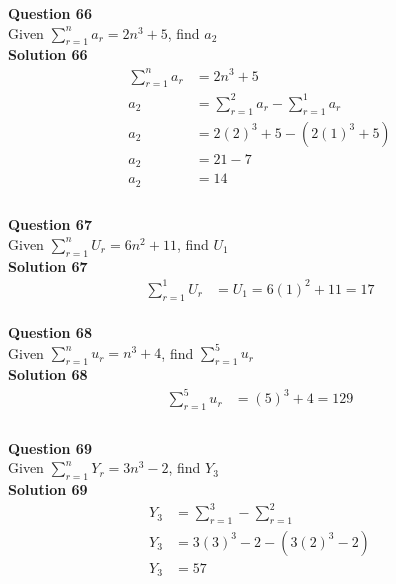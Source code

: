 \documentclass{article}
\begin{document}
\noindent\textbf{Question 66}\\[5pt]
Given $\displaystyle\sum_{r=1}^{n} a_r = 2n^3+5$, find $a_2$\\[5pt]
\noindent\textbf{Solution 66}\\[5pt]
\begin{align*}
\displaystyle\sum_{r=1}^{n} a_r &= 2n^3+5\\[2pt]
a_2&=\displaystyle\sum_{r=1}^{2} a_r - \displaystyle\sum_{r=1}^{1} a_r \\[2pt]
a_2&= 2(2)^3+5- (2(1)^3+5) \\[2pt]
a_2&= 21- 7 \\[2pt]
a_2&= 14 \\[2pt]
\end{align*}\\[10pt]

\noindent\textbf{Question 67}\\[5pt]
Given $\displaystyle\sum_{r=1}^{n} U_r = 6n^2+11$, find $U_1$\\[5pt]
\noindent\textbf{Solution 67}\\[5pt]
\begin{align*}
\displaystyle\sum_{r=1}^{1} U_r &=U_1=6(1)^2+11=17
\end{align*}\\[10pt]

\noindent\textbf{Question 68}\\[5pt]
Given $\displaystyle\sum_{r=1}^{n} u_r = n^3+4$, find $\displaystyle\sum_{r=1}^{5} u_r$\\[5pt]
\noindent\textbf{Solution 68}\\[5pt]
\begin{align*}
\displaystyle\sum_{r=1}^{5} u_r &= (5)^3+4=129\\[2pt]
\end{align*}\\[10pt]

\noindent\textbf{Question 69}\\[5pt]
Given $\displaystyle\sum_{r=1}^{n} Y_r = 3n^3-2$, find $Y_3$\\[5pt]
\noindent\textbf{Solution 69}\\[5pt]
\begin{align*}
Y_3&=\displaystyle\sum_{r=1}^{3} - \displaystyle\sum_{r=1}^{2}\\[2pt]
Y_3&=3(3)^3-2 - (3(2)^3-2)\\[2pt]
Y_3&=57
\end{align*}\\[10pt]
\end{document}
